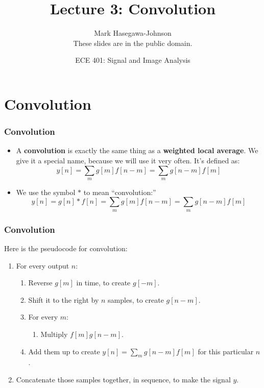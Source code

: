 \documentclass{beamer}
\title{Lecture 3: Convolution}
\author{Mark Hasegawa-Johnson\\These slides are in the public domain.}
\date{ECE 401: Signal and Image Analysis}
\begin{document}
\begin{frame}
  \maketitle
\end{frame}

\begin{frame}
  \tableofcontents
\end{frame}

\section[Convolution]{Convolution}
\setcounter{subsection}{1}

\begin{frame}
  \frametitle{Convolution}
  \begin{itemize}
  \item A {\bf convolution} is exactly the same thing as a {\bf weighted local average}.
    We give it a special name, because we will use it very often.  It's defined as:
    \[
    y[n] = \sum_m g[m] f[n-m] = \sum_m g[n-m] f[m]
    \]
  \item 
    We use the symbol $\ast$ to mean ``convolution:''
    \[
    y[n]=g[n]\ast f[n] = \sum_m g[m] f[n-m] = \sum_m g[n-m] f[m]
    \]
  \end{itemize}
\end{frame}

\begin{frame}
  \frametitle{Convolution}
  \centerline{}

  \vspace*{2mm}
  
  Here is the pseudocode for convolution:
  \begin{enumerate}
  \item For every output $n$:
    \begin{enumerate}
    \item Reverse $g[m]$ in time, to create $g[-m]$.
    \item Shift it to the right by $n$ samples, to create $g[n-m]$.
    \item For every $m$:
      \begin{enumerate}
      \item Multiply $f[m]g[n-m]$.
      \end{enumerate}
    \item Add them up to create $y[n] = \sum_m g[n-m] f[m]$ for this particular $n$.
    \end{enumerate}
    \item Concatenate those samples together, in sequence, to make the signal $y$.
  \end{enumerate}
\end{frame}
\end{document}
